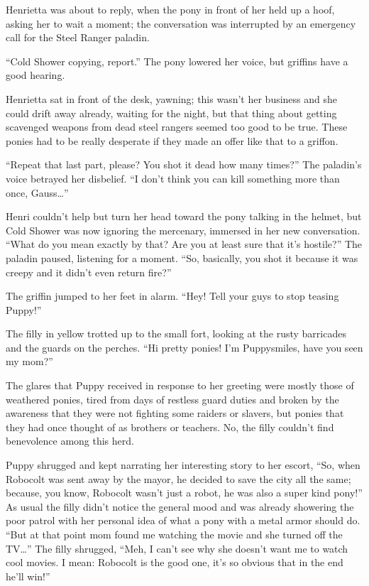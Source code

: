 Henrietta was about to reply, when the pony in front of her held up a hoof, asking her to wait a moment; the conversation was interrupted by an emergency call for the Steel Ranger paladin.

``Cold Shower copying, report.'' The pony lowered her voice, but griffins have a good hearing.

Henrietta sat in front of the desk, yawning; this wasn't her business and she could drift away already, waiting for the night, but that thing about getting scavenged weapons from dead steel rangers seemed too good to be true. These ponies had to be really desperate if they made an offer like that to a griffon.

``Repeat that last part, please? You shot it dead how many times?'' The paladin's voice betrayed her disbelief. ``I don't think you can kill something more than once, Gauss\dots''

Henri couldn't help but turn her head toward the pony talking in the helmet, but Cold Shower was now ignoring the mercenary, immersed in her new conversation. ``What do you mean exactly by that? Are you at least sure that it's hostile?'' The paladin paused, listening for a moment. ``So, basically, you shot it because it was creepy and it didn't even return fire?''

The griffin jumped to her feet in alarm. ``Hey! Tell your guys to stop teasing Puppy!''

\horizonline


The filly in yellow trotted up to the small fort, looking at the rusty barricades and the guards on the perches. ``Hi pretty ponies! I'm Puppysmiles, have you seen my mom?''

The glares that Puppy received in response to her greeting were mostly those of weathered ponies, tired from days of restless guard duties and broken by the awareness that they were not fighting some raiders or slavers, but ponies that they had once thought of as brothers or teachers. No, the filly couldn't find benevolence among this herd.

Puppy shrugged and kept narrating her interesting story to her escort, ``So, when Robocolt was sent away by the mayor, he decided to save the city all the same; because, you know, Robocolt wasn't just a robot, he was also a super kind pony!'' As usual the filly didn't notice the general mood and was already showering the poor patrol with her personal idea of what a pony with a metal armor should do. ``But at that point mom found me watching the movie and she turned off the TV\dots'' The filly shrugged, ``Meh, I can't see why she doesn't want me to watch cool movies. I mean: Robocolt is the good one, it's so obvious that in the end he'll win!''

